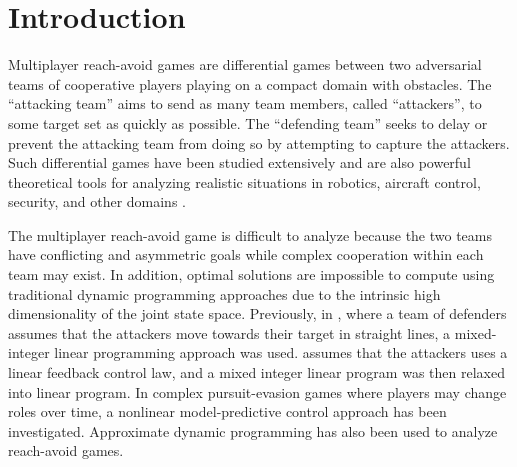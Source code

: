 \section{Introduction}

Multiplayer reach-avoid games are differential games between two adversarial teams of cooperative players playing on a compact domain with obstacles. The ``attacking team'' aims to send as many team members, called ``attackers'', to some target set as quickly as possible. The ``defending team'' seeks to delay or prevent the attacking team from doing so by attempting to capture the attackers. Such differential games have been studied extensively \cite{HThesis, Huang2011} and are also powerful theoretical tools for analyzing realistic situations in robotics, aircraft control, security, and other domains \cite{OFTHEAIRFORCEWASHINGTON:2009p37, Erzberger:2006p44, kiva2009}.


The multiplayer reach-avoid game is difficult to analyze because the two teams have conflicting and asymmetric goals while complex cooperation within each team may exist. In addition, optimal solutions are impossible to compute using traditional dynamic programming approaches due to the intrinsic high dimensionality of the joint state space. Previously, in \cite{Earl:2007p101}, where a team of defenders assumes that the attackers move towards their target in straight lines, a mixed-integer linear programming approach was used. \cite{Chasparis:2005p102} assumes that the attackers uses a linear feedback control law, and a mixed integer linear program was then relaxed into linear program. In complex pursuit-evasion games where players may change roles over time, a nonlinear model-predictive control \cite{Sprinkle:2004p100} approach has been investigated. Approximate dynamic programming \cite{McGrew:2008p103} has also been used to analyze reach-avoid games.

